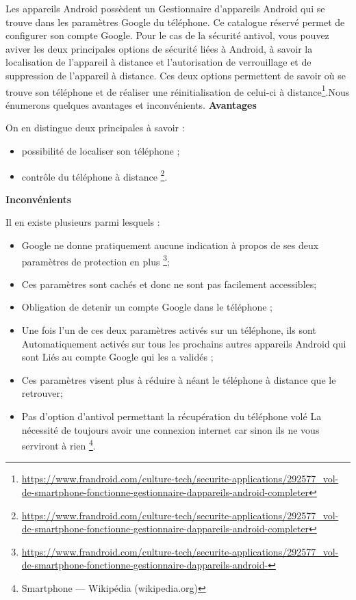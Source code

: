 \documentclass[a4paper, 12pt]{article}
\begin{document}
\quad Les appareils Android possèdent un Gestionnaire d’appareils Android qui se trouve dans les paramètres Google du téléphone. Ce catalogue réservé permet de configurer son compte Google. Pour le cas de la sécurité antivol, vous pouvez aviver les deux principales options de sécurité liées à Android, à savoir la localisation de l’appareil à distance et l’autorisation de verrouillage et de suppression de l’appareil à distance. Ces deux options permettent de savoir où se trouve son téléphone et de réaliser une réinitialisation de celui-ci à distance\footnote{\url{https://www.frandroid.com/culture-tech/securite-applications/292577_vol-de-smartphone-fonctionne-gestionnaire-dappareils-android-completer}}.Nous énumerons quelques avantages et inconvénients.
\newline
\textbf{Avantages}

On en distingue deux principales à savoir :
\begin{itemize}
\item possibilité de localiser son téléphone ;
\item contrôle du téléphone à distance \footnote{\url{https://www.frandroid.com/culture-tech/securite-applications/292577_vol-de-smartphone-fonctionne-gestionnaire-dappareils-android-completer}}.
\end{itemize}

\textbf{Inconvénients}

Il en existe plusieurs parmi lesquels :
\begin{itemize}
\item Google ne donne pratiquement aucune indication à propos de ses deux paramètres de protection en plus \footnote{\url{https://www.frandroid.com/culture-tech/securite-applications/292577_vol-de-smartphone-fonctionne-gestionnaire-dappareils-android-}};
\item Ces paramètres sont cachés et donc ne sont pas facilement accessibles;
\item Obligation de detenir un compte Google dans le téléphone ;
\item Une fois l’un de ces deux paramètres activés sur un téléphone, ils sont Automatiquement activés sur tous les prochains autres appareils Android qui sont Liés au compte Google qui les a validés ;
\item Ces paramètres visent plus à réduire à néant le téléphone à distance que le retrouver;
\item Pas d’option d’antivol permettant la récupération du téléphone volé La nécessité de toujours avoir une connexion internet car sinon ils ne vous serviront à rien \footnote{Smartphone — Wikipédia (wikipedia.org)}.  
\end{itemize}
\end{document}
